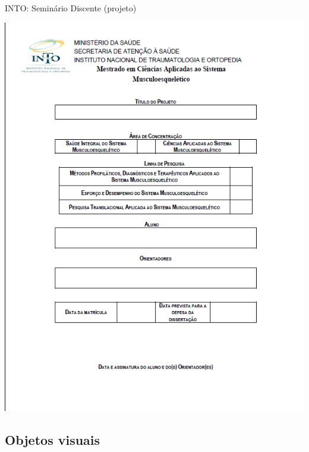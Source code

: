\documentclass{beamer}
\begin{document}
\begin{frame}{INTO: Seminário Discente (projeto)}
  \begin{center}
    \includegraphics[height=\textheight]{EstruturaII/projeto}
  \end{center}
\end{frame}

\subsection{Objetos visuais}
\end{document}
